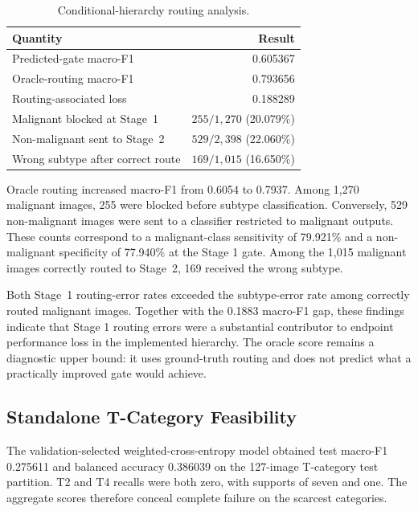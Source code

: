 \begin{table}[t]
    \centering
    \caption{Conditional-hierarchy routing analysis.}
    \label{tab:routing_results}
    \footnotesize
    \setlength{\tabcolsep}{3.5pt}
    \begin{tabular}{lr}
        \toprule
        Quantity & Result \\
        \midrule
        Predicted-gate macro-F1 & 0.605367 \\
        Oracle-routing macro-F1 & 0.793656 \\
        Routing-associated loss & 0.188289 \\
        \midrule
        Malignant blocked at Stage~1
        & $255/1{,}270$ (20.079\%) \\
        Non-malignant sent to Stage~2
        & $529/2{,}398$ (22.060\%) \\
        Wrong subtype after correct route
        & $169/1{,}015$ (16.650\%) \\
        \bottomrule
    \end{tabular}
\end{table}

Oracle routing increased macro-F1 from 0.6054 to 0.7937. Among 1,270
malignant images, 255 were blocked before subtype classification. Conversely,
529 non-malignant images were sent to a classifier restricted to malignant
outputs. These counts correspond to a malignant-class sensitivity of 79.921\%
and a non-malignant specificity of 77.940\% at the Stage 1 gate. Among the 1,015 malignant images correctly routed to Stage~2, 169
received the wrong subtype.

Both Stage~1 routing-error rates exceeded the subtype-error rate among
correctly routed malignant images. Together with the 0.1883 macro-F1 gap, these findings indicate that Stage 1
routing errors were a substantial contributor to endpoint performance loss
in the implemented hierarchy. The oracle score remains a diagnostic upper bound: it uses
ground-truth routing and does not predict what a practically improved gate
would achieve.

\subsection{Standalone T-Category Feasibility}

The validation-selected weighted-cross-entropy model obtained test macro-F1
0.275611 and balanced accuracy 0.386039 on the 127-image T-category test
partition. T2 and T4 recalls were both zero, with supports of seven and one.
The aggregate scores therefore conceal complete failure on the scarcest
categories.

